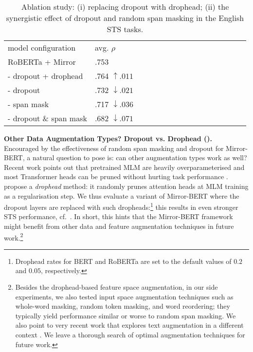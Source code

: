 \documentclass[11pt]{article}
\begin{document}
\begin{table}[!t]
\centering
\fontsize{10}{10}\selectfont
\def\arraystretch{0.9}
\begin{tabularx}{\linewidth}{XXXXX XXXXXXXXXXX}
\cmidrule[1.0pt]{1-10}
model configuration & avg. $\rho$\\
\cmidrule[1.0pt]{1-10}
RoBERTa + Mirror & .753 \\
\hdashline
- dropout + drophead & .764 ${\uparrow .011}$  \\
\hdashline
 - dropout & .732 ${\downarrow .021}$ \\
 - span mask & .717 ${\downarrow .036}$ \\
 - dropout \& span mask & .682 ${\downarrow .071}$ \\
\cmidrule[1.0pt]{1-10}
\end{tabularx}
\caption{Ablation study: (i) replacing dropout with drophead; (ii) the synergistic effect of dropout and random span masking in the English STS tasks.}
\label{tab:synersitic}
\end{table}

\vspace{1.5mm}
\noindent \textbf{Other Data Augmentation Types? Dropout vs. Drophead ().}
Encouraged by the effectiveness of random span masking and dropout for Mirror-BERT, a natural question to pose is: can other augmentation types work as well? 
Recent work points out that pretrained MLM are heavily overparameterised and most Transformer heads can be pruned without hurting task performance \citep{voita2019analyzing,kovaleva2019revealing,michel2019sixteen}. \citet{zhou2020scheduled} propose a \textit{drophead} method: it randomly prunes attention heads at MLM training as a regularisation step. We thus evaluate a variant of Mirror-BERT where the dropout layers are replaced with such dropheads:\footnote{Drophead rates for BERT and RoBERTa are set to the default values of $0.2$ and $0.05$, respectively.} this results in even stronger STS performance, cf.~. In short, this hints that the Mirror-BERT framework might benefit from other data and feature augmentation techniques in future work.\footnote{Besides the drophead-based feature space augmentation, in our side experiments, we also tested input space augmentation techniques such as whole-word masking, random token masking, and word reordering; they typically yield performance similar or worse to random span masking. We also point to very recent work that explores text augmentation in a different context \citep{wu2020clear,meng2021coco}. We leave a thorough search of optimal augmentation techniques for future work.}
\end{document}
